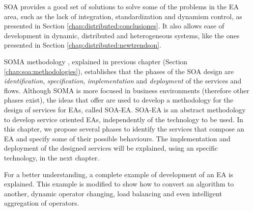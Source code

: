 \label{chap:soaea}
\minitoc\mtcskip
\vfill
\lettrine{S}{OA} provides a good set of solutions to solve some of the
problems in the EA area, such as the lack of integration,
standardization and dynamism control, as presented in Section \ref{chap:distributed:conclusiones}. It also allows ease of
development in dynamic, distributed and heterogeneous systems, like the ones presented in Section \ref{chap:distributed:newtrendson}. %


SOMA methodology \cite{Arsanjani2008SOMA}, explained in previous chapter (Section \ref{chap:soa:methodologies}), establishes that the phases of the SOA design are {\em identification}, {\em specification}, {\em implementation} and {\em deployment} of the services and flows. Although SOMA is more focused in business environments (therefore other phases exist), the ideas that offer are used to develop a methodology for the design of services for EAs, called SOA-EA. SOA-EA is an abstract methodology to develop service oriented EAs, independently of the technology to be used. In this chapter, we propose several phases to identify the services that compose an EA and specify some of their possible behaviours. The implementation and deployment of the designed services will be explained, using an specific technology, in the next chapter.

For a better understanding, a complete example of development of an EA
is explained. This example is modified to show how to convert an
algorithm to another, dynamic operator changing, load balancing and
even intelligent aggregation of operators. 



